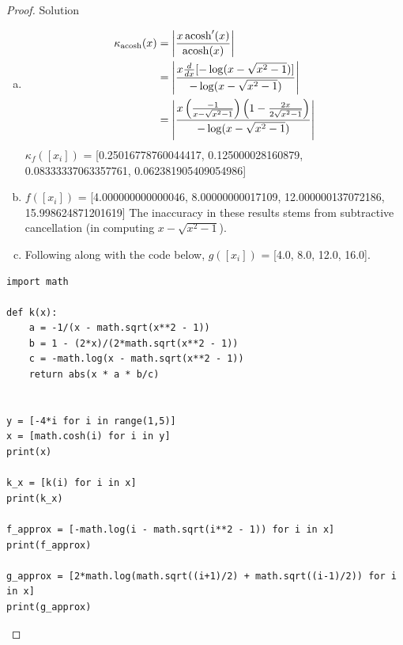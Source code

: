 \documentclass{article}
\DeclareMathOperator{\acosh}{acosh}
\DeclarePairedDelimiter{\abs}{\lvert}{\rvert}
\theoremstyle{definition}
\begin{document}
\begin{proof}{Solution}
\begin{enumerate}[(a)]
\item
\begin{align*}
    \kappa_{\acosh}(x) &= \abs*{\frac{x \acosh'(x)}{\acosh(x)}} \\
    &= \abs*{\frac{x\frac{d}{dx}[-\log(x - \sqrt{x^2 - 1})]}{-\log(x - \sqrt{x^2 - 1})}} \\
    &= \abs*{\frac{x\left(\frac{-1}{x - \sqrt{x^2 - 1}}\right)\left(1 - \frac{2x}{2\sqrt{x^2 - 1}}\right)}{-\log(x - \sqrt{x^2 - 1})}}
\end{align*}
$\kappa_f([x_i])$ = [0.25016778760044417, 0.125000028160879, 0.08333337063357761, 0.062381905409054986]
\item $f([x_i])$ = [4.000000000000046, 8.00000000017109, 12.000000137072186, 15.998624871201619]
The inaccuracy in these results stems from subtractive cancellation (in computing $x - \sqrt{x^2 - 1}$).
\item Following along with the code below, $g([x_i])$ = [4.0, 8.0, 12.0, 16.0].
\end{enumerate}

\begin{lstlisting}
import math

def k(x):
    a = -1/(x - math.sqrt(x**2 - 1))
    b = 1 - (2*x)/(2*math.sqrt(x**2 - 1))
    c = -math.log(x - math.sqrt(x**2 - 1))
    return abs(x * a * b/c)


y = [-4*i for i in range(1,5)]
x = [math.cosh(i) for i in y]
print(x)

k_x = [k(i) for i in x]
print(k_x)

f_approx = [-math.log(i - math.sqrt(i**2 - 1)) for i in x]
print(f_approx)

g_approx = [2*math.log(math.sqrt((i+1)/2) + math.sqrt((i-1)/2)) for i in x]
print(g_approx)
\end{lstlisting}
\end{proof}
\end{document}
